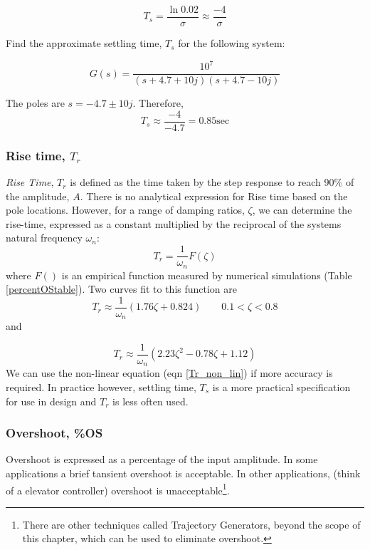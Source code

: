 \[
T_s = \frac{\ln{0.02}}{\sigma} \approx \frac{-4}{\sigma}
\]

\begin{ExampleSmall}
Find the approximate settling time, $T_s$ for the following system:

\[
G(s) = \frac {10^7}  {(s+4.7+10j)(s+4.7-10j)}
\]

\vspace{0.25in}
The poles are $s=-4.7\pm10j$.  Therefore,
\[
T_s \approx \frac{-4}{-4.7}  = 0.85 \mathrm{sec}
\]
\end{ExampleSmall}



\subsubsection{Rise time, $T_r$}
{\it Rise Time}, $T_r$ is defined as the time taken by the step response to reach 90\% of the amplitude, $A$.  
There is no analytical expression for Rise time based on the pole locations.   However, for a range of damping ratios, $\zeta$,
we can determine the rise-time, expressed as a constant multiplied by the reciprocal of the systems natural frequency $\omega_n$:
\begin{equation}
T_r = \frac{1}{\omega_n}F(\zeta)
\end{equation}
where $F()$ is an empirical function measured by numerical simulations (Table \ref{percentOStable}).   Two curves fit to this function are
\begin{equation}
T_r \approx \frac{1}{\omega_n}(1.76\zeta + 0.824) \qquad   0.1< \zeta < 0.8
\end{equation}
and

\begin{equation}\label{Tr_non_lin}
T_r \approx \frac{1}{\omega_n}(2.23\zeta^2 - 0.78\zeta + 1.12)
\end{equation}
We can use the non-linear equation (eqn \ref{Tr_non_lin}) if more accuracy is required.
In practice however, settling time, $T_s$ is a more practical specification for use in design and $T_r$ is less often used. 


\subsubsection{Overshoot, \%OS}

Overshoot is expressed as a percentage of the input amplitude.   In some applications a brief tansient overshoot is acceptable.  In other applications, (think of a elevator controller) overshoot is unacceptable\footnote{There are other techniques called Trajectory Generators, beyond the scope of this chapter, which can be used to eliminate overshoot.}.

